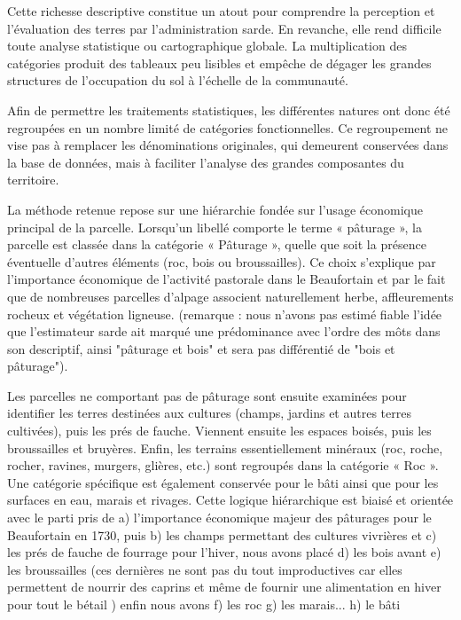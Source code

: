 \documentclass[12pt,a4paper]{report}
\begin{document}
Cette richesse descriptive constitue un atout pour comprendre la perception et l'évaluation des terres par l'administration sarde. En revanche, elle rend difficile toute analyse statistique ou cartographique globale. La multiplication des catégories produit des tableaux peu lisibles et empêche de dégager les grandes structures de l'occupation du sol à l'échelle de la communauté.

Afin de permettre les traitements statistiques, les différentes natures ont donc été regroupées en un nombre limité de catégories fonctionnelles. Ce regroupement ne vise pas à remplacer les dénominations originales, qui demeurent conservées dans la base de données, mais à faciliter l'analyse des grandes composantes du territoire.

La méthode retenue repose sur une hiérarchie fondée sur l'usage économique principal de la parcelle. Lorsqu'un libellé comporte le terme « pâturage », la parcelle est classée dans la catégorie « Pâturage », quelle que soit la présence éventuelle d'autres éléments (roc, bois ou broussailles). Ce choix s'explique par l'importance économique de l'activité pastorale dans le Beaufortain et par le fait que de nombreuses parcelles d'alpage associent naturellement herbe, affleurements rocheux et végétation ligneuse. (remarque : nous n'avons pas estimé fiable l'idée que l'estimateur sarde ait marqué une prédominance avec l'ordre des môts dans son descriptif, ainsi "pâturage et bois" et sera pas différentié de "bois et pâturage").

Les parcelles ne comportant pas de pâturage sont ensuite examinées pour identifier les terres destinées aux cultures (champs, jardins et autres terres cultivées), puis les prés de fauche. Viennent ensuite les espaces boisés, puis les broussailles et bruyères. Enfin, les terrains essentiellement minéraux (roc, roche, rocher, ravines, murgers, glières, etc.) sont regroupés dans la catégorie « Roc ». Une catégorie spécifique est également conservée pour le bâti ainsi que pour les surfaces en eau, marais et rivages. Cette logique hiérarchique est biaisé et orientée avec le parti pris de a) l'importance économique majeur des pâturages pour le Beaufortain en 1730, puis b) les champs permettant des cultures vivrières et c) les prés de fauche de fourrage pour l'hiver, nous avons placé d) les bois avant e) les broussailles (ces dernières ne sont pas du tout improductives car elles permettent de nourrir des caprins et même de fournir une alimentation en hiver pour tout le bétail ) enfin nous avons f) les roc g) les marais... h) le bâti
\end{document}
